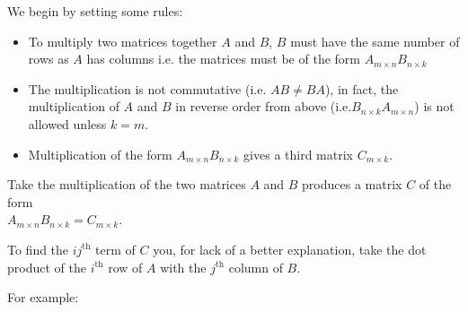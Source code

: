 \documentclass[main.tex]{subfiles}
\begin{document}
                    We begin by setting some rules:
                    \vspace{-1em}
                    \begin{itemize}
                        \item To multiply two matrices together $A$ and $B$, $B$ must have the same number of rows as $A$ has columns i.e. the matrices must be of the form $A_{m \times n}B_{n \times k}$
                        \item The multiplication is not commutative (i.e. $AB \neq BA$), in fact, the multiplication of $A$ and $B$ in reverse order from above (i.e.$B_{n \times k}A_{m \times n}$) is not allowed unless $k = m$.
                        \item Multiplication of the form $A_{m \times n}B_{n \times k}$ gives a third matrix $C_{m \times k}$.
                    \end{itemize}

                
                    Take the multiplication of the two matrices $A$ and $B$ produces a matrix $C$ of the form \\$A_{m \times n}B_{n \times k} = C_{m \times k}$.

                    To find the $ij^{\text{th}}$ term of $C$ you, for lack of a better explanation, take the dot product of the $i^{\text{th}}$ row of $A$ with the $j^{\text{th}}$ column of $B$.

                    For example:
\end{document}

